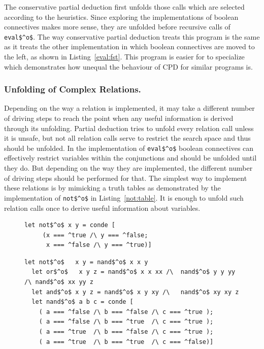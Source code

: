 The conservative partial deduction first unfolds those calls which are selected according to the heuristics.
Since exploring the implementations of boolean connectives makes more sense, they are unfolded before recursive calls of \lstinline{eval$^o$}.
The way conservative partial deduction treats this program is the same as it treats the other implementation in which boolean connectives
are moved to the left, as shown in Listing~\ref{eval:fst}.
This program is easier for \ecce to specialize which demonstrates how unequal the behaviour of CPD for similar programs is.

\subsubsection{Unfolding of Complex Relations.}

Depending on the way a relation is implemented, it may take a different number of driving steps to reach the point when any useful information is derived through its unfolding.
Partial deduction tries to unfold every relation call unless it is unsafe, but not all relation calls serve to restrict the search space and thus should be unfolded.
In the implementation of \lstinline{eval$^o$} boolean connectives can effectively restrict variables within the conjunctions and should be unfolded until they do.
But depending on the way they are implemented, the different number of driving steps should be performed for that.
The simplest way to implement these relations is by mimicking a truth tables as demonstrated by the implementation of \lstinline{not$^o$} in Listing~\ref{not:table}.
It is enough to unfold such relation calls once to derive useful information about variables.

\begin{figure}[!t]
  \centering
  \begin{minipage}{0.7\textwidth}
    \begin{lstlisting}[label={not:table}, caption={Implementation of boolean \lstinline{not} as a table}, captionpos=b, frame=tb]
  let not$^o$ x y = conde [
     (x === ^true /\ y === ^false;
      x === ^false /\ y === ^true)]
    \end{lstlisting}
  \end{minipage}
  \begin{minipage}{0.9\textwidth}
    \begin{lstlisting}[label={not:nando}, caption={Implementation of boolean operation via \lstinline{nand}}, captionpos=b, frame=tb]
  let not$^o$   x y = nand$^o$ x x y
  let or$^o$   x y z = nand$^o$ x x xx /\  nand$^o$ y y yy /\ nand$^o$ xx yy z
  let and$^o$ x y z = nand$^o$ x y xy /\   nand$^o$ xy xy z
  let nand$^o$ a b c = conde [
    ( a === ^false /\ b === ^false /\ c === ^true );
    ( a === ^false /\ b === ^true  /\ c === ^true );
    ( a === ^true  /\ b === ^false /\ c === ^true );
    ( a === ^true  /\ b === ^true  /\ c === ^false)]
    \end{lstlisting}
  \end{minipage}
\end{figure}

